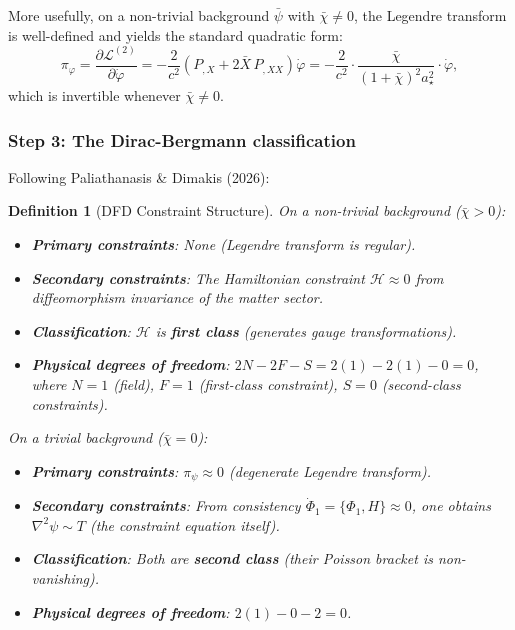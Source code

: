 \documentclass[11pt,a4paper]{article}
\newtheorem{definition}{Definition}
\begin{document}
More usefully, on a non-trivial background $\bar\psi$ with $\bar\chi \neq 0$, the Legendre transform is well-defined and yields the standard quadratic form:
\begin{equation}
\pi_\varphi = \frac{\partial\mathcal{L}^{(2)}}{\partial\dot\varphi} = -\frac{2}{c^2}\left(P_{,X} + 2\bar{X}\,P_{,XX}\right)\dot\varphi
= -\frac{2}{c^2}\cdot\frac{\bar\chi}{(1+\bar\chi)^2 a_\star^2}\cdot\dot\varphi,
\end{equation}
which is invertible whenever $\bar\chi \neq 0$.

\subsubsection{Step 3: The Dirac-Bergmann classification}

Following Paliathanasis \& Dimakis (2026):

\begin{definition}[DFD Constraint Structure]
On a non-trivial background ($\bar\chi > 0$):
\begin{itemize}
\item \textbf{Primary constraints}: None (Legendre transform is regular).
\item \textbf{Secondary constraints}: The Hamiltonian constraint $\mathcal{H} \approx 0$ from diffeomorphism invariance of the matter sector.
\item \textbf{Classification}: $\mathcal{H}$ is \textbf{first class} (generates gauge transformations).
\item \textbf{Physical degrees of freedom}: $2N - 2F - S = 2(1) - 2(1) - 0 = 0$, where $N=1$ (field), $F=1$ (first-class constraint), $S=0$ (second-class constraints).
\end{itemize}

On a trivial background ($\bar\chi = 0$):
\begin{itemize}
\item \textbf{Primary constraints}: $\pi_\psi \approx 0$ (degenerate Legendre transform).
\item \textbf{Secondary constraints}: From consistency $\dot\Phi_1 = \{\Phi_1, H\} \approx 0$, one obtains $\nabla^2\psi \sim T$ (the constraint equation itself).
\item \textbf{Classification}: Both are \textbf{second class} (their Poisson bracket is non-vanishing).
\item \textbf{Physical degrees of freedom}: $2(1) - 0 - 2 = 0$.
\end{itemize}
\end{definition}
\end{document}
